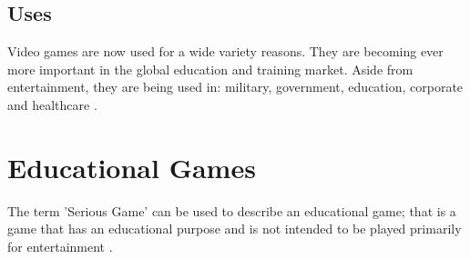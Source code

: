 \documentclass[a4paper,11.5pt]{report}
\numberwithin{figure}{section}
\numberwithin{table}{section}
\numberwithin{equation}{section}
\numberwithin{equation}{section}
\begin{document}
\subsection{Uses}

Video games are now used for a wide variety reasons. They are becoming ever more important in the global education and training market. Aside from entertainment, they are being used in: military, government, education, corporate and healthcare \citep{Johann2015}.







\section{Educational Games}

The term 'Serious Game' can be used to describe an educational game; that is a game that has an educational purpose and is not intended to be played primarily for entertainment \citep[see][]{abt1970}. 
\end{document}

